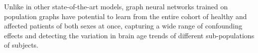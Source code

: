 Unlike in other state-of-the-art models, graph neural networks trained on population graphs have potential to learn from the entire cohort of healthy and affected patients of both sexes at once, capturing a wide range of confounding effects and detecting the variation in brain age trends of different sub-populations of subjects.







